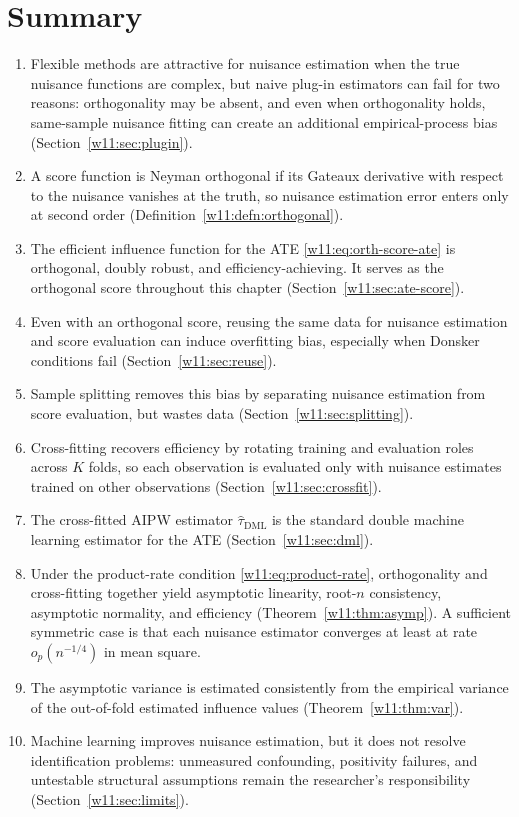 \documentclass[master.tex]{subfiles}
\begin{document}
\section{Summary}
\label{w11:sec:summary}

\begin{enumerate}
  \item Flexible methods are attractive for nuisance estimation when
    the true nuisance functions are complex, but naive plug-in
    estimators can fail for two reasons: orthogonality may be
    absent, and even when orthogonality holds, same-sample nuisance
    fitting can create an additional empirical-process bias
    (Section~\ref{w11:sec:plugin}).
  \item A score function is Neyman orthogonal if its Gateaux
    derivative with respect to the nuisance vanishes at the truth,
    so nuisance estimation error enters only at second order
    (Definition~\ref{w11:defn:orthogonal}).
  \item The efficient influence function for the ATE
    \eqref{w11:eq:orth-score-ate} is orthogonal, doubly robust,
    and efficiency-achieving.  It serves as the orthogonal score
    throughout this chapter (Section~\ref{w11:sec:ate-score}).
  \item Even with an orthogonal score, reusing the same data for
    nuisance estimation and score evaluation can induce overfitting
    bias, especially when Donsker conditions fail
    (Section~\ref{w11:sec:reuse}).
  \item Sample splitting removes this bias by separating nuisance
    estimation from score evaluation, but wastes data
    (Section~\ref{w11:sec:splitting}).
  \item Cross-fitting recovers efficiency by rotating training
    and evaluation roles across $K$ folds, so each observation is
    evaluated only with nuisance estimates trained on other
    observations (Section~\ref{w11:sec:crossfit}).
  \item The cross-fitted AIPW estimator $\hat\tau_{\mathrm{DML}}$
    is the standard double machine learning estimator for the ATE
    (Section~\ref{w11:sec:dml}).
  \item Under the product-rate condition
    \eqref{w11:eq:product-rate}, orthogonality and cross-fitting
    together yield asymptotic linearity, root-$n$ consistency,
    asymptotic normality, and efficiency
    (Theorem~\ref{w11:thm:asymp}).  A sufficient symmetric case
    is that each nuisance estimator converges at least at rate
    $o_p(n^{-1/4})$ in mean square.
  \item The asymptotic variance is estimated consistently from the
    empirical variance of the out-of-fold estimated influence
    values (Theorem~\ref{w11:thm:var}).
  \item Machine learning improves nuisance estimation, but it does
    not resolve identification problems: unmeasured confounding,
    positivity failures, and untestable structural assumptions
    remain the researcher's responsibility
    (Section~\ref{w11:sec:limits}).
\end{enumerate}
\end{document}
